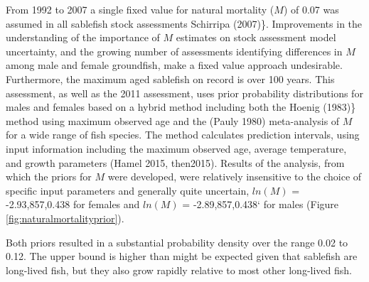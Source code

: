 \documentclass[11pt,
  english,
  a4paper,
]{article}
\begin{document}
From 1992 to 2007 a single fixed value for natural mortality ({\(M\)\leavevmode\tagmcend\tagstructend}) of 0.07 was assumed in all sablefish stock assessments {Schirripa (2007)\leavevmode\tagmcend\tagstructend}\}. Improvements in the understanding of the importance of {\(M\)\leavevmode\tagmcend\tagstructend} estimates on stock assessment model uncertainty, and the growing number of assessments identifying differences in {\(M\)\leavevmode\tagmcend\tagstructend} among male and female groundfish, make a fixed value approach undesirable. Furthermore, the maximum aged sablefish on record is over 100 years. This assessment, as well as the 2011 assessment, uses prior probability distributions for males and females based on a hybrid method including both the {Hoenig (1983)\leavevmode\tagmcend\tagstructend}\} method using maximum observed age and the {(Pauly 1980)\leavevmode\tagmcend\tagstructend} meta-analysis of {\(M\)\leavevmode\tagmcend\tagstructend} for a wide range of fish species. The method calculates prediction intervals, using input information including the maximum observed age, average temperature, and growth parameters {(Hamel 2015, then2015)\leavevmode\tagmcend\tagstructend}. Results of the analysis, from which the priors for {\(M\)\leavevmode\tagmcend\tagstructend} were developed, were relatively insensitive to the choice of specific input parameters and generally quite uncertain, {\(ln(M)\)\leavevmode\tagmcend\tagstructend} = -2.93,857,0.438 for females and {\(ln(M)\)\leavevmode\tagmcend\tagstructend} = -2.89,857,0.438` for males (Figure \ref{fig:naturalmortalityprior}).

\leavevmode\tagmcend\tagstructend\par


Both priors resulted in a substantial probability density over the range 0.02 to 0.12. The upper bound is higher than might be expected given that sablefish are long-lived fish, but they also grow rapidly relative to most other long-lived fish.
\end{document}

